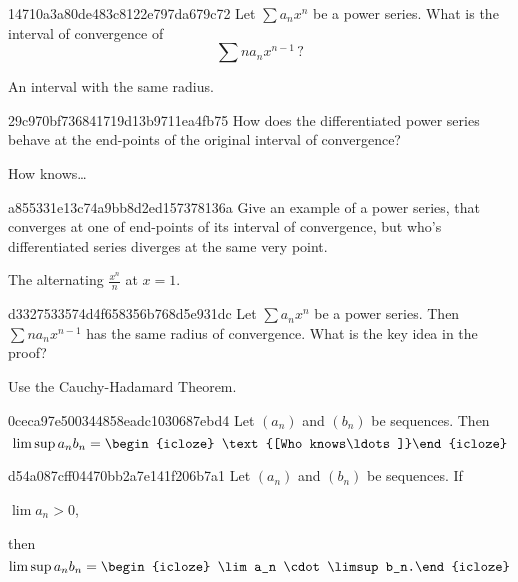 \begin{note}{14710a3a80de483c8122e797da679c72}
    Let \({ \sum a_n x^{n} }\) be a power series.
    What is the interval of convergence of
    \[
        \sum n a_n x^{n-1}\,?
    \]

    \begin{cloze}{1}
        An interval with the same radius.
    \end{cloze}
\end{note}

\begin{note}{29c970bf736841719d13b9711ea4fb75}
    How does the dif\-fer\-en\-ti\-ated power series behave at the end-points of the original interval of convergence?

    \begin{cloze}{1}
        How knows\ldots
    \end{cloze}
\end{note}

\begin{note}{a855331e13c74a9bb8d2ed157378136a}
    Give an example of a power series, that converges at one of end-points of its interval of convergence, but who's dif\-fer\-en\-ti\-ated series diverges at the same very point.

    \begin{cloze}{1}
        The alternating \({ \frac{x^{n}}{n} }\) at \({ x = 1 }\).
    \end{cloze}
\end{note}

\begin{note}{d3327533574d4f658356b768d5e931dc}
    Let \({ \sum a_n x^{n} }\) be a power series.
    Then \({ \sum n a_n x^{n-1} }\) has the same radius of convergence.
    What is the key idea in the proof?

    \begin{cloze}{1}
        Use the Cauchy-Hadamard Theorem.
    \end{cloze}
\end{note}

\begin{note}{0ceca97e500344858eadc1030687ebd4}
    Let \({ (a_n) }\) and \({ (b_n) }\) be sequences.
    Then
    \[
        \limsup a_n b_n = \begin{icloze}{1}\text{[Who knows\ldots]}\end{icloze}
    \]
\end{note}

\begin{note}{d54a087cff04470bb2a7e141f206b7a1}
    Let \({ (a_n) }\) and \({ (b_n) }\) be sequences.
    If \begin{icloze}{2}\({ \lim a_n > 0 }\),\end{icloze} then
    \[
        \limsup a_n b_n = \begin{icloze}{1}\lim a_n \cdot \limsup b_n.\end{icloze}
    \]
\end{note}

